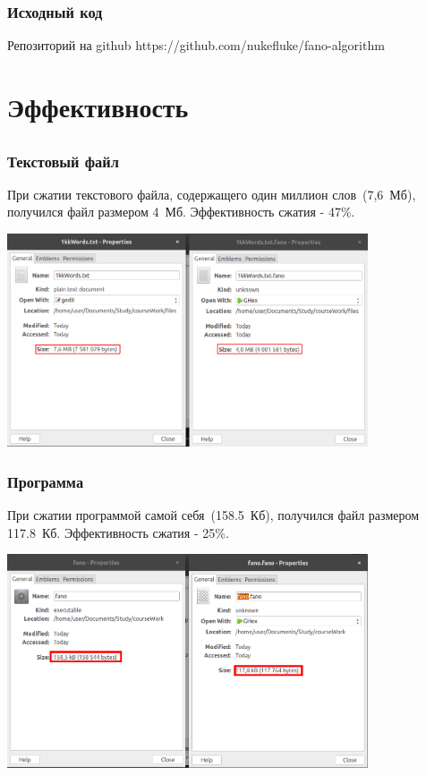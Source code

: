 \documentclass[10pt,pdf,hyperref={unicode}]{beamer}
\begin{document}
	\begin{frame}
		\frametitle{Исходный код}
		\begin{block}{Репозиторий на github}
			https://github.com/nukefluke/fano-algorithm
		\end{block}
	\end{frame}

\section{Эффективность}
\subsection{}

\begin{frame}\frametitle{Текстовый файл}
	При сжатии текстового файла, содержащего один миллион слов~(7,6~Мб), 
	получился файл размером 4~Мб. Эффективность сжатия - 47\%.\newline

	\centering
	\includegraphics[width=0.8\textwidth]{compare.png}
\end{frame}

\begin{frame}\frametitle{Программа}
		При сжатии программой самой себя~(158.5~Кб), 
		получился файл размером 117.8~Кб. Эффективность сжатия - 25\%.\newline

		\centering
		\includegraphics[width=0.8\textwidth]{compare1.png}
\end{frame}
\end{document}
